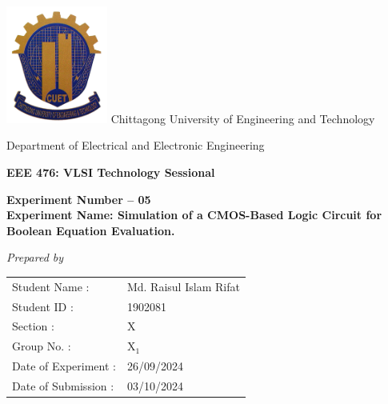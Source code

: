 \documentclass[11pt]{article}
\begin{document}
\begin{titlepage}
   \begin{center}
      \vspace*{3.5cm}
      \includegraphics[width=0.25\textwidth,center]{cuet}
      \vspace{1cm}
      \huge
      Chittagong University of Engineering and Technology

      \LARGE
      Department of Electrical and Electronic Engineering

      \vspace{1cm}
      \huge
      \textbf{EEE 476: VLSI Technology Sessional}

      \vspace{1cm}
      \LARGE
      \textbf{Experiment Number -- 05\\Experiment Name: Simulation of a CMOS-Based Logic Circuit for Boolean Equation Evaluation.}

      \vspace{1cm}
      \Large
      \textit{Prepared by}\\
      \vspace{0.5cm}
      \setlength{\tabcolsep}{0.001pt}
      \begin{tabularx}{\textwidth}{
            >{\raggedleft\arraybackslash}X
            >{\raggedright\arraybackslash}X}
         Student Name :       & \hspace{0.2cm}Md. Raisul Islam Rifat \\
         Student ID :         & \hspace{0.2cm}1902081                \\
         Section :            & \hspace{0.2cm}X                      \\
         Group No. :          & \hspace{0.2cm}$\text{X}_1$           \\
         Date of Experiment : & \hspace{0.2cm}26/09/2024             \\
         Date of Submission : & \hspace{0.2cm}03/10/2024             \\
      \end{tabularx}
   \end{center}
\end{titlepage}
\end{document}
